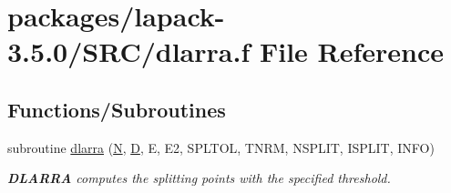 \hypertarget{dlarra_8f}{}\section{packages/lapack-\/3.5.0/\+S\+R\+C/dlarra.f File Reference}
\label{dlarra_8f}
\subsection*{Functions/\+Subroutines}
\begin{DoxyCompactItemize}
\item 
subroutine \hyperlink{group__auxOTHERauxiliary_ga0b5719c25a81a95270cd36178e283166}{dlarra} (\hyperlink{polmisc_8c_a0240ac851181b84ac374872dc5434ee4}{N}, \hyperlink{odrpack_8h_a7dae6ea403d00f3687f24a874e67d139}{D}, E, E2, S\+P\+L\+T\+O\+L, T\+N\+R\+M, N\+S\+P\+L\+I\+T, I\+S\+P\+L\+I\+T, I\+N\+F\+O)
\begin{DoxyCompactList}\small\item\em {\bfseries D\+L\+A\+R\+R\+A} computes the splitting points with the specified threshold. \end{DoxyCompactList}\end{DoxyCompactItemize}
